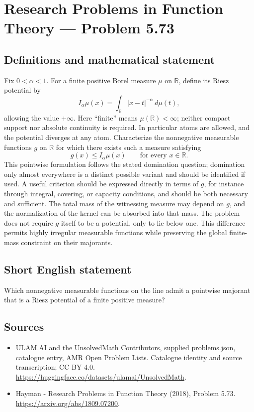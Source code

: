 \documentclass[11pt,a4paper]{article}
\begin{document}
\section*{Research Problems in Function Theory — Problem 5.73}\label{statement}

\subsection{Definitions and mathematical statement}
Fix $0<\alpha<1$. For a finite positive Borel measure $\mu$ on $\mathbb R$, define its Riesz potential by
\[
I_\alpha\mu(x)=\int_{\mathbb R}|x-t|^{-\alpha}\,d\mu(t),
\]
allowing the value $+\infty$. Here ``finite'' means $\mu(\mathbb R)<\infty$; neither compact support nor absolute continuity is required. In particular atoms are allowed, and the potential diverges at any atom.
Characterize the nonnegative measurable functions $g$ on $\mathbb R$ for which there exists such a measure satisfying
\[
g(x)\le I_\alpha\mu(x)\qquad\text{for every }x\in\mathbb R.
\]
This pointwise formulation follows the stated domination question; domination only almost everywhere is a distinct possible variant and should be identified if used. A useful criterion should be expressed directly in terms of $g$, for instance through integral, covering, or capacity conditions, and should be both necessary and sufficient.
The total mass of the witnessing measure may depend on $g$, and the normalization of the kernel can be absorbed into that mass. The problem does not require $g$ itself to be a potential, only to lie below one. This difference permits highly irregular measurable functions while preserving the global finite-mass constraint on their majorants.
\subsection{Short English statement}
Which nonnegative measurable functions on the line admit a pointwise majorant that is a Riesz potential of a finite positive measure?
\subsection{Sources}
\begin{itemize}
\item[S1] ULAM.AI and the UnsolvedMath Contributors, supplied problems.json, catalogue entry, AMR Open Problem Lists. Catalogue identity and source transcription; CC BY 4.0.
\url{https://huggingface.co/datasets/ulamai/UnsolvedMath}.
\item[S2] Hayman - Research Problems in Function Theory (2018), Problem 5.73. 
\url{https://arxiv.org/abs/1809.07200}.
\end{itemize}
\end{document}
